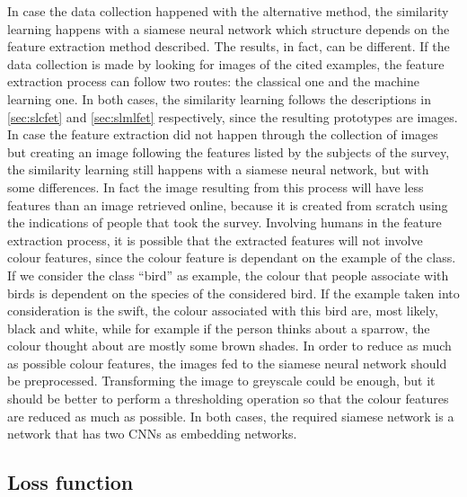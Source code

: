 \documentclass[conference]{IEEEtran}
\begin{document}
			\noindent In case the data collection happened with the alternative method, the similarity learning happens with a siamese neural network which structure depends on the feature extraction method described. The 
			results, in fact, can be different. If the data collection is made by looking for images of the cited examples, the feature extraction process can follow two routes: the classical one and the machine learning 
			one. In both cases, the similarity learning follows the descriptions in \ref{sec:slcfet} and \ref{sec:slmlfet} respectively, since the resulting prototypes are images. In case the feature extraction did not happen through 
			the collection of images but creating an image following the features listed by the subjects of the survey, the similarity learning still happens with a siamese neural network, but with some differences. In fact 
			the image resulting from this process will have less features than an image retrieved online, because it is created from scratch using the indications of people that took the survey. Involving humans in 
			the feature extraction process, it is possible that the extracted features will not involve colour features, since the colour feature is dependant on the example of the class. If we consider the class ``bird'' as
			example, the colour that people associate with birds is dependent on the species of the considered bird. If the example taken into consideration is the swift, the colour associated with this bird are, most likely, 
			black and white, while for example if the person thinks about a sparrow, the colour thought about are mostly some brown shades. In order to reduce as much as possible colour features, the images fed to 
			the siamese neural network should be preprocessed. Transforming the image to greyscale could be enough, but it should be better to perform a thresholding operation so that the colour features are reduced as much 
			as possible. In both cases, the required siamese network is a network that has two CNNs as embedding networks. 
		
		\subsection{Loss function}
		
\end{document}
